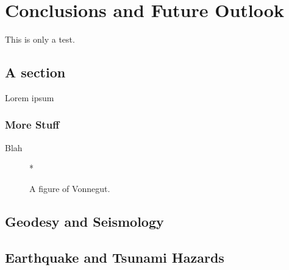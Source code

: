 
\chapter{Conclusions and Future Outlook}
This is only a test.
\section{A section}
Lorem ipsum
\subsection{More Stuff}
Blah

\begin{figure}[h] 
  \centering
  *
  \caption{A figure of Vonnegut.} 
\end{figure}

\section{Geodesy and Seismology}

\section{Earthquake and Tsunami Hazards}



